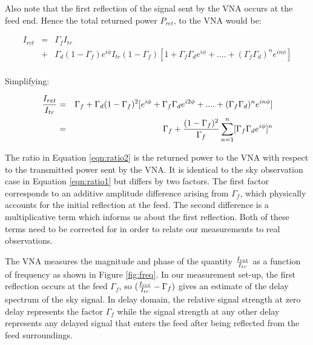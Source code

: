 \documentclass[12pt,preprint]{aastex}
\begin{document}
Also note that the first reflection of the signal sent by the VNA occurs at the feed end. Hence the total returned power $P_{ret}$, to the VNA  would be:

\begin{eqnarray}
I_{ret} & = & \Gamma_{f}I_{tr} \nonumber\\ 
 & + &   \Gamma_{d}(1-\Gamma_f)e^{i\phi} I_{tr}(1-\Gamma_{f}) [1+ \Gamma_{f}\Gamma_{d} e^{i\phi}+  ....+ (\Gamma_{f}\Gamma_{d})^{n}e^{in\phi}]\nonumber\\
 \end{eqnarray}
 
Simplifying:
 
  \begin{eqnarray}\label{eqn:ratio2}
 {I_{ret} \over I_{tr} } & = & \Gamma_{f}
  +  \Gamma_{d}(1-\Gamma_f)^{2} [e^{i\phi}+ \Gamma_{f}\Gamma_{d} e^{i2\phi}+  ....+ (\Gamma_{f}\Gamma_{d})^{n}e^{i n\phi}]\nonumber\\
  & = & \Gamma_{f} + { (1-\Gamma_f)^{2}\over \Gamma_{f} } \displaystyle\sum\limits_{n=1}^{n} [\Gamma_{f}\Gamma_{d}e^{i\phi}]^{n}
   \nonumber\\
\end{eqnarray}

The ratio in Equation \ref{eqn:ratio2} is the returned power to the VNA with
respect to the transmitted power sent by the VNA. It is identical to the sky
observation case in Equation \ref{eqn:ratio1} but differs by two factors. The
first factor corresponds to an additive amplitude difference arising from
$\Gamma_{f}$, which physically accounts for the initial reflection at the feed.
The second difference is a multiplicative term which informs us about the first
reflection. Both of these terms need to be corrected for in order to relate our
measurements to real observations.

The VNA measures the magnitude and phase of the quantity ${I_{ret}\over I_{tr}}$
as a function of frequency as shown in Figure \ref{fig:freq}. In our measurement
set-up, the first reflection occurs at the feed $\Gamma_{f}$, so
$({I_{ret} \over I_{tr} }  - \Gamma_{f}) $ gives an estimate of the delay
spectrum of the sky signal. In delay domain, the relative signal strength at
zero delay represents the factor $\Gamma_{f}$ while the signal strength at any
other delay represents any delayed signal that enters the feed after being
reflected from the feed surroundings. 
\end{document}
